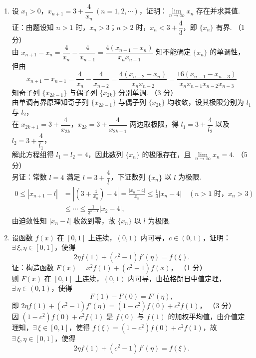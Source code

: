 \documentclass[a4paper,11pt]{ctexart}
\newcommand{\score}[1]{\hfill（#1）}
\begin{document}
\begin{enumerate}[label=\arabic*., start=16, leftmargin=2em, itemsep=1.0em, topsep=0.5em]
  \item 设 $x_1 > 0$，$x_{n+1} = 3 + \dfrac{4}{x_n}~(n = 1, 2, \cdots)$，证明：$\lim\limits_{n\to\infty} x_n$ 存在并求其值.\\[0.3em]
  证：由题设知 $n > 1$ 时，$x_n > 3$；$n > 2$ 时，$x_n < 3 + \dfrac{4}{3}$，即 $\{x_n\}$ 有界. \score{1 分}\\[0.3em]
  由 $x_{n+1} - x_n = \dfrac{4}{x_n} - \dfrac{4}{x_{n-1}} = \dfrac{4(x_{n-1} - x_n)}{x_n x_{n-1}}$ 知不能确定 $\{x_n\}$ 的单调性，但由
  \[
    x_{n+1} - x_{n-1} = \frac{4}{x_n} - \frac{4}{x_{n-2}} = \frac{4(x_{n-2} - x_n)}{x_n x_{n-2}} = \frac{16(x_{n-1} - x_{n-3})}{x_n x_{n-1} x_{n-2} x_{n-3}}
  \]
  知奇子列 $\{x_{2k-1}\}$ 与偶子列 $\{x_{2k}\}$ 分别单调. \score{3 分}\\[0.3em]
  由单调有界原理知奇子列 $\{x_{2k-1}\}$ 与偶子列 $\{x_{2k}\}$ 均收敛，设其极限分别为 $l_1$ 与 $l_2$，\\[0.2em]
  在 $x_{2k+1} = 3 + \dfrac{4}{x_{2k}}$，$x_{2k} = 3 + \dfrac{4}{x_{2k-1}}$ 两边取极限，得 $l_1 = 3 + \dfrac{4}{l_2}$ 以及 $l_2 = 3 + \dfrac{4}{l_1}$，\\[0.2em]
  解此方程组得 $l_1 = l_2 = 4$，因此数列 $\{x_n\}$ 的极限存在，且 $\lim\limits_{n\to\infty} x_n = 4$. \score{5 分}\\[0.5em]
  另证：常数 $l = 4$ 满足 $l = 3 + \dfrac{4}{l}$，下证数列 $\{x_n\}$ 以 $l$ 为极限.
  \begin{align*}
    0 \le |x_{n+1} - l| &= \left|\left(3 + \frac{4}{x_n}\right) - 4\right| = \frac{|x_n - 4|}{x_n} \le \frac{1}{3}|x_n - 4| \quad (n > 1\text{ 时，}x_n > 3) \\
    &\le \cdots \le \frac{1}{3^{n-1}}|x_2 - 4|,
  \end{align*}
  由迫敛性知 $|x_n - l|$ 收敛到零，故 $\{x_n\}$ 以 $l$ 为极限.

  \item 设函数 $f(x)$ 在 $[0, 1]$ 上连续，$(0, 1)$ 内可导，$c \in (0, 1)$，证明：$\exists\,\xi, \eta \in [0, 1]$，使得
  \[
    2\eta f(1) + (c^2 - 1)f'(\eta) = f(\xi).
  \]
  证：构造函数 $F(x) = x^2 f(1) + (c^2 - 1)f(x)$， \score{1 分}\\[0.2em]
  则 $F(x)$ 在 $[0, 1]$ 上连续，$(0, 1)$ 内可导，由拉格朗日中值定理，$\exists\,\eta \in (0, 1)$，使得
  \[
    F(1) - F(0) = F'(\eta),
  \]
  即 $2\eta f(1) + (c^2 - 1)f'(\eta) = (1 - c^2)f(0) + c^2 f(1)$， \score{3 分}\\[0.2em]
  因 $(1 - c^2)f(0) + c^2 f(1)$ 是 $f(0)$ 与 $f(1)$ 的加权平均值，由介值定理知，$\exists\,\xi \in [0, 1]$，使得 $f(\xi) = (1 - c^2)f(0) + c^2 f(1)$，故 $\exists\,\xi, \eta \in [0, 1]$，使得
  \[
    2\eta f(1) + (c^2 - 1)f'(\eta) = f(\xi). \tag*{（5 分）}
  \]
\end{enumerate}
\end{document}
